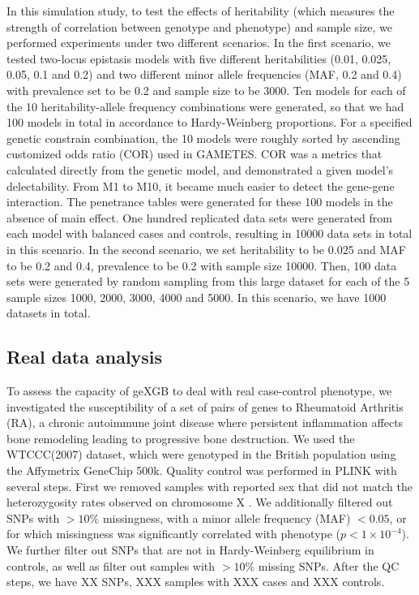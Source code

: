 \documentclass[11pt]{article}
\theoremstyle{plain}
\theoremstyle{definition}
\theoremstyle{remark}
\begin{document}
\noindent In this simulation study, to test the effects of heritability (which measures the strength of correlation between genotype and phenotype) and sample size, we performed experiments under two different scenarios. In the first scenario, we tested two-locus epistasis models with five different heritabilities (0.01, 0.025, 0.05, 0.1 and 0.2) and two different minor allele frequencies (MAF, 0.2 and 0.4) with prevalence set to be 0.2 and sample size to be 3000. Ten models for each of the 10 heritability-allele frequency combinations were generated, so that we had 100 models in total in accordance to Hardy-Weinberg proportions. For a specified genetic constrain combination, the 10 models were roughly sorted by ascending customized odds ratio (COR) used in GAMETES. COR was a metrics that calculated directly from the genetic model, and demonstrated a given model's delectability. From M1 to M10, it became much easier to detect the gene-gene interaction. The penetrance tables were generated for these 100 models in the absence of main effect. One hundred replicated data sets were generated from each model with balanced cases and controls, resulting in 10000 data sets in total in this scenario. In the second scenario, we set heritability to be 0.025 and MAF to be 0.2 and 0.4, prevalence to be 0.2 with sample size 10000. Then, 100 data sets were generated by random sampling from this large dataset for each of the 5 sample sizes 1000, 2000, 3000, 4000 and 5000. In this scenario, we have 1000 datasets in total.\\

\subsection{Real data analysis}
To assess the capacity of geXGB to deal with real case-control phenotype, we investigated the susceptibility of a set of pairs of genes to Rheumatoid Arthritis (RA), a chronic autoimmune joint disease where persistent inflammation affects bone remodeling leading to progressive bone destruction. We used the WTCCC(2007) dataset, which were genotyped in the British population using the Affymetrix GeneChip 500k. Quality control was performed in PLINK with several steps. First we removed samples with reported sex that did not match the heterozygosity rates observed on chromosome X \cite{12}. We additionally filtered out SNPs with $>10\%$ missingness,  with a minor allele frequency (MAF) $<0.05$, or for which missingness was significantly correlated with
phenotype ($p<1\times 10^{-4}$). We further filter out SNPs that are not in Hardy-Weinberg equilibrium in controls, as well as filter out samples with $>10\%$ missing SNPs. After the QC steps, we have XX SNPs, XXX samples with XXX cases and XXX controls.\\
\end{document}
